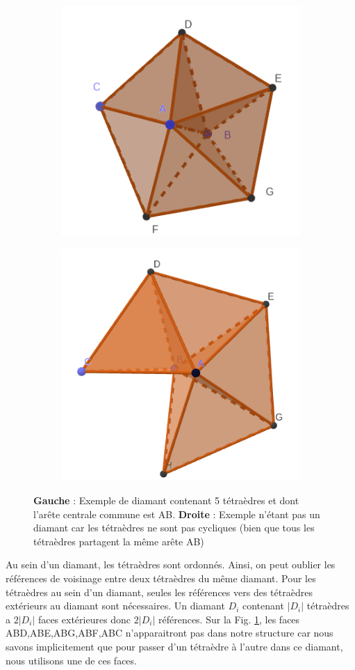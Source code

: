 \begin{figure}[H]
\centering
\begin{subfigure}{.5\textwidth}
  \centering
  \includegraphics[scale=0.3]{../Images/full_diamond}
  \caption{}
  \label{fig:full_diamond2}
\end{subfigure}%
\begin{subfigure}{.5\textwidth}
  \centering
  \includegraphics[scale=0.26]{../Images/not_full_diamond}
  \caption{}
  \label{fig:not_full_diamond}
\end{subfigure}
\caption{\textbf{Gauche} : Exemple de diamant contenant 5 tétraèdres et dont l'arête centrale commune est AB. \textbf{Droite} : Exemple n'étant pas un diamant car les tétraèdres ne sont pas cycliques (bien que tous les tétraèdres partagent la même arête AB)}
\end{figure}
\noindent
Au sein d'un diamant, les tétraèdres sont ordonnés. Ainsi, on peut oublier les références de voisinage entre deux tétraèdres du même diamant. Pour les tétraèdres au sein d'un diamant, seules les références vers des tétraèdres extérieurs au diamant sont nécessaires. Un diamant $D_i$ contenant $|D_i|$ tétraèdres a $2|D_i|$ faces extérieures donc $2|D_i|$ références. Sur la Fig. \ref{fig:full_diamond2}, les faces ABD,ABE,ABG,ABF,ABC n'apparaitront pas dans notre structure car nous savons implicitement que pour passer d'un tétraèdre à l'autre dans ce diamant, nous utilisons une de ces faces.

